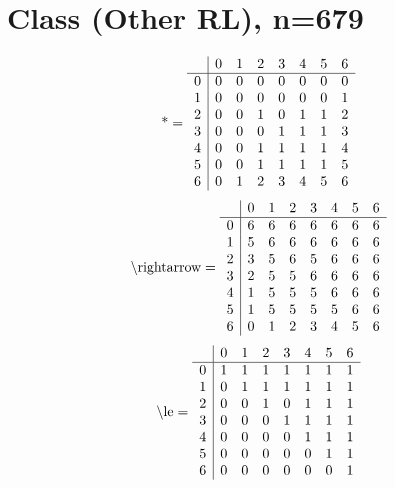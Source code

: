 \documentclass[11pt]{article}
\begin{document}
\section{Class (Other RL), n=679}
\[\text{*} = 
\begin{array}{r | r r r r r r r}
 & 0 & 1 & 2 & 3 & 4 & 5 & 6 \\ \hline
0 & 0 & 0 & 0 & 0 & 0 & 0 & 0 \\
1 & 0 & 0 & 0 & 0 & 0 & 0 & 1 \\
2 & 0 & 0 & 1 & 0 & 1 & 1 & 2 \\
3 & 0 & 0 & 0 & 1 & 1 & 1 & 3 \\
4 & 0 & 0 & 1 & 1 & 1 & 1 & 4 \\
5 & 0 & 0 & 1 & 1 & 1 & 1 & 5 \\
6 & 0 & 1 & 2 & 3 & 4 & 5 & 6 \\
\end{array}
\]
\[\text{\textbackslash rightarrow} = 
\begin{array}{r | r r r r r r r}
 & 0 & 1 & 2 & 3 & 4 & 5 & 6 \\ \hline
0 & 6 & 6 & 6 & 6 & 6 & 6 & 6 \\
1 & 5 & 6 & 6 & 6 & 6 & 6 & 6 \\
2 & 3 & 5 & 6 & 5 & 6 & 6 & 6 \\
3 & 2 & 5 & 5 & 6 & 6 & 6 & 6 \\
4 & 1 & 5 & 5 & 5 & 6 & 6 & 6 \\
5 & 1 & 5 & 5 & 5 & 5 & 6 & 6 \\
6 & 0 & 1 & 2 & 3 & 4 & 5 & 6 \\
\end{array}
\]
\[\text{\textbackslash le} = 
\begin{array}{r | r r r r r r r}
 & 0 & 1 & 2 & 3 & 4 & 5 & 6 \\ \hline
0 & 1 & 1 & 1 & 1 & 1 & 1 & 1 \\
1 & 0 & 1 & 1 & 1 & 1 & 1 & 1 \\
2 & 0 & 0 & 1 & 0 & 1 & 1 & 1 \\
3 & 0 & 0 & 0 & 1 & 1 & 1 & 1 \\
4 & 0 & 0 & 0 & 0 & 1 & 1 & 1 \\
5 & 0 & 0 & 0 & 0 & 0 & 1 & 1 \\
6 & 0 & 0 & 0 & 0 & 0 & 0 & 1 \\
\end{array}
\]
\end{document}

